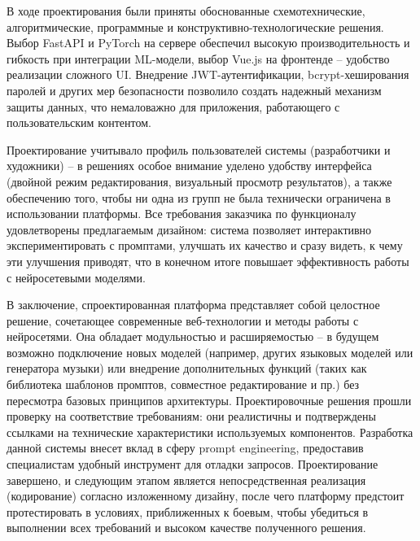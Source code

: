 В ходе проектирования были приняты обоснованные схемотехнические, алгоритмические, программные и конструктивно-технологические решения. Выбор FastAPI и PyTorch на сервере обеспечил высокую производительность и гибкость при интеграции ML-модели, выбор Vue.js на фронтенде – удобство реализации сложного UI. Внедрение JWT-аутентификации, bcrypt-хеширования паролей и других мер безопасности позволило создать надежный механизм защиты данных, что немаловажно для приложения, работающего с пользовательским контентом.

Проектирование учитывало профиль пользователей системы (разработчики и художники) – в решениях особое внимание уделено удобству интерфейса (двойной режим редактирования, визуальный просмотр результатов), а также обеспечению того, чтобы ни одна из групп не была технически ограничена в использовании платформы. Все требования заказчика по функционалу удовлетворены предлагаемым дизайном: система позволяет интерактивно экспериментировать с промптами, улучшать их качество и сразу видеть, к чему эти улучшения приводят, что в конечном итоге повышает эффективность работы с нейросетевыми моделями.

В заключение, спроектированная платформа представляет собой целостное решение, сочетающее современные веб-технологии и методы работы с нейросетями. Она обладает модульностью и расширяемостью – в будущем возможно подключение новых моделей (например, других языковых моделей или генератора музыки) или внедрение дополнительных функций (таких как библиотека шаблонов промптов, совместное редактирование и пр.) без пересмотра базовых принципов архитектуры. Проектировочные решения прошли проверку на соответствие требованиям: они реалистичны и подтверждены ссылками на технические характеристики используемых компонентов.
Разработка данной системы внесет вклад в сферу prompt engineering, предоставив специалистам удобный инструмент для отладки запросов. Проектирование завершено, и следующим этапом является непосредственная реализация (кодирование) согласно изложенному дизайну, после чего платформу предстоит протестировать в условиях, приближенных к боевым, чтобы убедиться в выполнении всех требований и высоком качестве полученного решения.